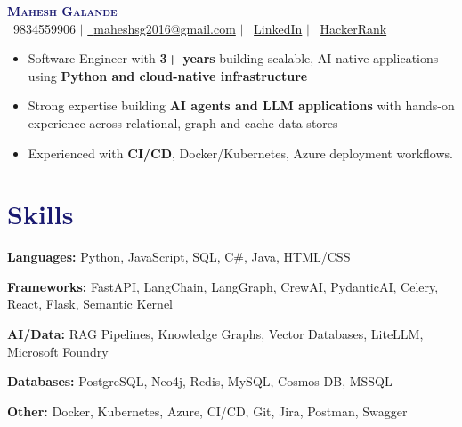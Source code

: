 \documentclass[letterpaper,11pt]{article}
\begin{document}
\begin{center}
    \textbf{\Huge \scshape \textcolor{MidnightBlue}{Mahesh Galande}} \\ \vspace{2pt}
    \small \faPhone\ {9834559906} $|$ \href{mailto:maheshsg2016@gmail.com}{\textcolor{BrickRed}{\faEnvelope\ {maheshsg2016@gmail.com}}} $|$ 
    \textcolor{BrickRed}{\faLinkedin\ \href{https://www.linkedin.com/in/mahesh-galande-235b09241/}{{LinkedIn}}} $|$ 
    \textcolor{BrickRed}{\faCode\ \href{https://www.hackerrank.com/profile/maheshsg2016}{HackerRank}}
\end{center}


\vspace{-4pt}

\begin{itemize}[leftmargin=0.15in, label={\textbullet}, itemsep=1pt]
    \small
    \item Software Engineer with \textbf{3+ years} building scalable, AI-native applications using \textbf{Python and cloud-native infrastructure}
    \item Strong expertise building \textbf{AI agents and LLM applications} with hands-on experience across relational, graph and cache data stores
    \item Experienced with \textbf{CI/CD}, Docker/Kubernetes, Azure deployment workflows.
\end{itemize}

\section{\textcolor{MidnightBlue}{Skills}}
\begin{itemize}[leftmargin=0.15in, label={}, itemsep=1pt]
\small{
\item \textbf{Languages:} Python, JavaScript, SQL, C\#, Java, HTML/CSS
\item \textbf{Frameworks:} FastAPI, LangChain, LangGraph, CrewAI, PydanticAI, Celery, React, Flask, Semantic Kernel
\item \textbf{AI/Data:} RAG Pipelines, Knowledge Graphs, Vector Databases, LiteLLM, Microsoft Foundry
\item \textbf{Databases:} PostgreSQL, Neo4j, Redis, MySQL, Cosmos DB, MSSQL
\item \textbf{Other:} Docker, Kubernetes, Azure, CI/CD, Git, Jira, Postman, Swagger
}
\end{itemize}
\end{document}
